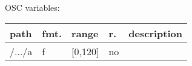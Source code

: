 \begin{snugshade}
{\footnotesize
\label{osctab:tascarapconst}
OSC variables:
\nopagebreak

\begin{tabularx}{\textwidth}{llllX}
\hline
path & fmt. & range & r. & description\\
\hline
/.../a & f & [0,120] & no & \\
\hline
\end{tabularx}
}
\end{snugshade}

